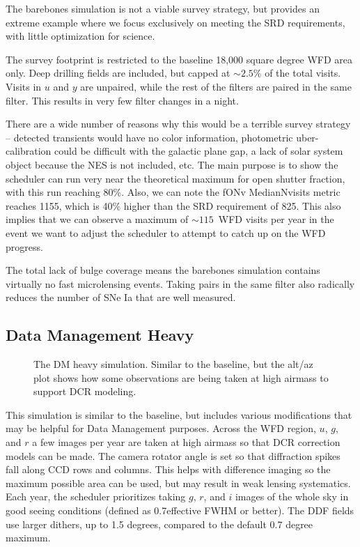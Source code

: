 The barebones simulation is not a viable survey strategy, but provides an extreme example where we focus exclusively on meeting the SRD requirements, with little optimization for science.

The survey footprint is restricted to the baseline 18,000 square degree WFD area only. Deep drilling fields are included, but capped at $\sim2.5$\% of the total visits. Visits in $u$ and $y$ are unpaired, while the rest of the filters are paired in the same filter. This results in very few filter changes in a night. 

There are a wide number of reasons why this would be a terrible survey strategy -- detected transients would have no color information, photometric uber-calibration could be difficult with the galactic plane gap, a lack of solar system object because the NES is not included, etc.  The main purpose is to show the scheduler can run very near the theoretical maximum for open shutter fraction, with this run reaching 80\%. Also, we can note the fONv MedianNvisits metric reaches 1155, which is 40\% higher than the SRD requirement of 825. This also implies that we can observe a maximum of $\sim115$\ WFD visits per year in the event we want to adjust the scheduler to attempt to catch up on the WFD progress. 

The total lack of bulge coverage means the barebones simulation contains virtually no fast microlensing events. Taking pairs in the same filter also radically reduces the number of SNe Ia that are well measured. 

\subsection{Data Management Heavy}\label{ss:1.6dmheavy}

\begin{figure}
\caption{The DM heavy simulation. Similar to the baseline, but the alt/az plot shows how some observations are being taken at high airmass to support DCR modeling.}\label{fig:dmheavy}
\end{figure}


This simulation is similar to the baseline, but includes various modifications that may be helpful for Data Management purposes. Across the WFD region, $u$, $g$, and $r$ a few images per year are taken at high airmass so that DCR correction models can be made. The camera rotator angle is set so that diffraction spikes fall along CCD rows and columns. This helps with difference imaging so the maximum possible area can be used, but may result in weak lensing systematics.  Each year, the scheduler prioritizes taking $g$, $r$, and $i$ images of the whole sky in good seeing conditions (defined as 0.7\arcsec effective FWHM or better).  The DDF fields use larger dithers, up to 1.5 degrees, compared to the default 0.7 degree maximum.

